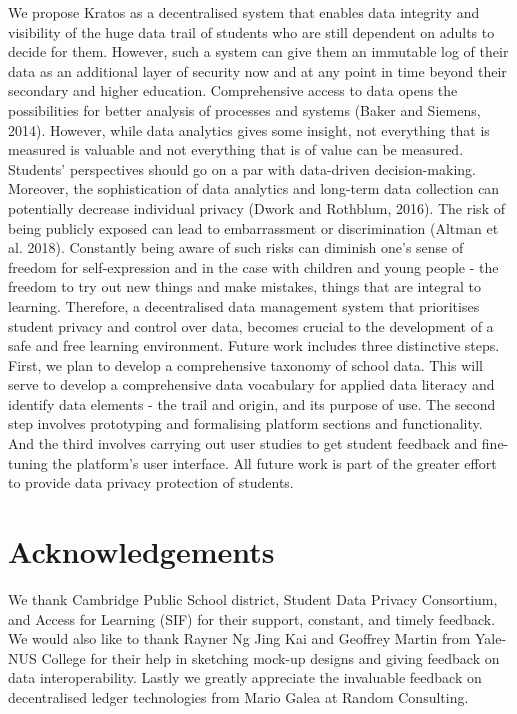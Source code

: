 \documentclass{article}
\begin{document}
\bigbreak
We propose Kratos as a decentralised system that enables data integrity and visibility of the huge data trail of students who are still dependent on adults to decide for them. However, such a system can give them an immutable log of their data as an additional layer of security now and at any point in time beyond their secondary and higher education.
\bigbreak
Comprehensive access to data opens the possibilities for better analysis of processes and systems (Baker and Siemens, 2014). However, while data analytics gives some insight, not everything that is measured is valuable and not everything that is of value can be measured. Students’ perspectives should go on a par with data-driven decision-making. Moreover, the sophistication of data analytics and long-term data collection can potentially decrease individual privacy (Dwork and Rothblum, 2016). The risk of being publicly exposed can lead to embarrassment or discrimination (Altman et al. 2018). Constantly being aware of such risks can diminish one’s sense of freedom for self-expression and in the case with children and young people - the freedom to try out new things and make mistakes, things that are integral to learning. Therefore, a decentralised data management system that prioritises student privacy and control over data, becomes crucial to the development of a safe and free learning environment.
\bigbreak
Future work includes three distinctive steps. First, we plan to develop a comprehensive taxonomy of school data. This will serve to develop a comprehensive data vocabulary for applied data literacy and identify data elements - the trail and origin, and its purpose of use. The second step involves prototyping and formalising platform sections and functionality. And the third involves carrying out user studies to get student feedback and fine-tuning the platform's user interface. All future work is part of the greater effort to provide data privacy protection of students. 

\section{Acknowledgements}
We thank Cambridge Public School district, Student Data Privacy Consortium, and Access for Learning (SIF) for their support, constant, and timely feedback. We would also like to thank Rayner Ng Jing Kai and Geoffrey Martin from Yale-NUS College for their help in sketching mock-up designs and giving feedback on data interoperability. Lastly we greatly appreciate the invaluable feedback on decentralised ledger technologies from Mario Galea at Random Consulting.
\end{document}

